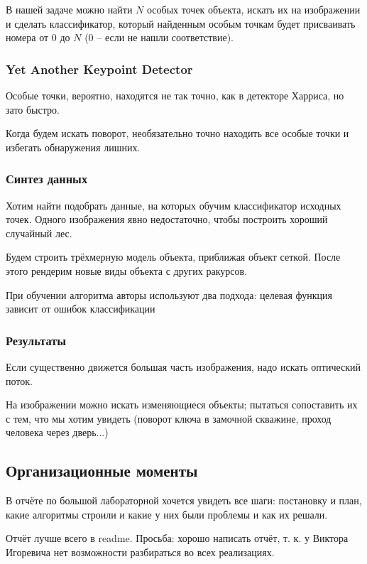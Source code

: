 \documentclass[main.tex]{subfiles}
\begin{document}
В нашей задаче можно найти $ N $ особых точек объекта, искать их на изображении и сделать классификатор, который найденным особым точкам будет присваивать номера от $ 0 $ до $ N $ (0 -- если не нашли соответствие).


\subsubsection{Yet Another Keypoint Detector}


Особые точки, вероятно, находятся не так точно, как в детекторе Харриса, но зато быстро.

Когда будем искать поворот, необязательно точно находить все особые точки и избегать обнаружения лишних.

\subsubsection{ Синтез данных }

Хотим найти подобрать данные, на которых обучим классификатор исходных точек.
Одного изображения явно недостаточно, чтобы построить хороший случайный лес.

Будем строить трёхмерную модель объекта, приближая объект сеткой.
После этого рендерим новые виды объекта с других ракурсов.

При обучении алгоритма авторы используют два подхода: целевая функция зависит от ошибок классификации

\subsubsection{ Результаты }

Если существенно движется большая часть изображения, надо искать оптический поток.

На изображении можно искать изменяющиеся объекты; пытаться сопоставить их с тем, что мы хотим увидеть (поворот ключа в замочной скважине, проход человека через дверь...)

\subsection{ Организационные моменты }

В отчёте по большой лабораторной хочется увидеть все шаги: постановку и план, какие алгоритмы строили и какие у них были проблемы и как их решали.

Отчёт лучше всего в readme.
Просьба: хорошо написать отчёт, т. к. у Виктора Игоревича нет возможности разбираться во всех реализациях.
\end{document}

